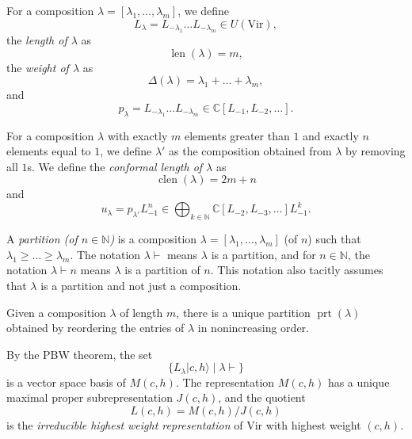 \documentclass[a4paper, 12pt, reqno]{amsart}
\theoremstyle{remark}
\DeclareMathOperator{\len}{len}
\DeclareMathOperator{\clen}{clen}
\DeclareMathOperator{\prt}{prt}
\newcommand{\Vir}{{\mathrm{Vir}}}
\begin{document}
For a composition $\lambda = [\lambda_1, \dots, \lambda_m]$, we define
\begin{equation*}
  L_\lambda = L_{-\lambda_1}\dots L_{-\lambda_m} \in U(\Vir),
\end{equation*}
the \emph{length of $\lambda$} as
\begin{equation*}
  \len(\lambda) = m,
\end{equation*}
the \emph{weight of $\lambda$} as
\begin{equation*}
  \Delta(\lambda) = \lambda_1 + \dots + \lambda_m,
\end{equation*}
and
\begin{equation*}
  p_\lambda = L_{-\lambda_1}\dots L_{-\lambda_m} \in \mathbb{C}[L_{-1}, L_{-2}, \dots].
\end{equation*}

For a composition $\lambda$ with exactly $m$ elements greater than $1$ and exactly $n$ elements equal to $1$, we define $\lambda'$ as the composition obtained from $\lambda$ by removing all $1$s.
We define the \emph{conformal length of $\lambda$} as
\begin{equation*}
  \clen(\lambda) = 2m + n
\end{equation*}
and
\begin{equation*}
  u_\lambda = p_{\lambda'}L_{-1}^n \in \bigoplus_{k \in \mathbb{N}}\mathbb{C}[L_{-2}, L_{-3}, \dots]L_{-1}^k.
\end{equation*}

A \emph{partition (of $n \in \mathbb{N}$)} is a composition $\lambda = [\lambda_1, \dots, \lambda_m]$ (of $n$) such that $\lambda_1 \ge \dots \ge \lambda_m$.
The notation $\lambda \vdash$ means $\lambda$ is a partition, and for $n \in \mathbb{N}$, the notation $\lambda \vdash n$ means $\lambda$ is a partition of $n$.
This notation also tacitly assumes that $\lambda$ is a partition and not just a composition.

Given a composition $\lambda$ of length $m$, there is a unique partition $\prt(\lambda)$ obtained by reordering the entries of $\lambda$ in nonincreasing order.

By the PBW theorem, the set
\begin{equation*}
  \{L_\lambda|c, h\rangle \mid \lambda \vdash\}
\end{equation*}
is a vector space basis of $M(c, h)$.
The representation $M(c, h)$ has a unique maximal proper subrepresentation $J(c, h)$, and the quotient
\begin{equation*}
  L(c, h) = M(c, h)/J(c, h)
\end{equation*}
is the \emph{irreducible highest weight representation} of $\Vir$ with highest weight $(c, h)$.
\end{document}
